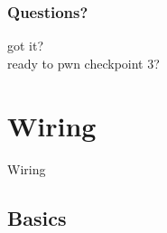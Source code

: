 \documentclass{beamer}
\begin{document}
\begin{frame}
\frametitle{Questions?}
\centering
{\huge got it?} \\
\vspace{20px}
\tiny{ready to pwn checkpoint 3?}
\end{frame}

\section{Wiring} %
\begin{frame}
\centering \huge Wiring
\end{frame}
\subsection{Basics}
\end{document}
